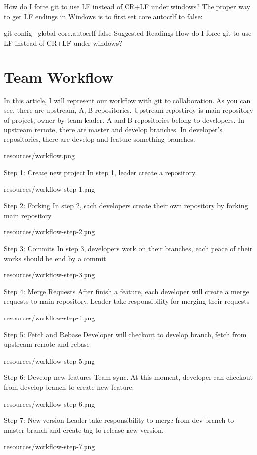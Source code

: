 How do I force git to use LF instead of CR+LF under windows?
The proper way to get LF endings in Windows is to first set core.autocrlf to false:

git config --global core.autocrlf false
Suggested Readings
How do I force git to use LF instead of CR+LF under windows?

\section{Team Workflow}

In this article, I will represent our workflow with git to collaboration. As you can see, there are upstream, A, B repositories. Upstream repostiroy is main repository of project, owner by team leader. A and B repositories belong to developers. In upstream remote, there are master and develop branches. In developer's repositories, there are develop and feature-something branches.

resources/workflow.png

Step 1: Create new project
In step 1, leader create a repository.

resources/workflow-step-1.png

Step 2: Forking
In step 2, each developers create their own repository by forking main repository

resources/workflow-step-2.png

Step 3: Commits
In step 3, developers work on their branches, each peace of their works should be end by a commit

resources/workflow-step-3.png

Step 4: Merge Requests
After finish a feature, each developer will create a merge requests to main repository. Leader take responsibility for merging their requests

resources/workflow-step-4.png

Step 5: Fetch and Rebase
Developer will checkout to develop branch, fetch from upstream remote and rebase

resources/workflow-step-5.png

Step 6: Develop new features
Team sync. At this moment, developer can checkout from develop branch to create new feature.

resources/workflow-step-6.png

Step 7: New version
Leader take responsibility to merge from dev branch to master branch and create tag to release new version.

resources/workflow-step-7.png

